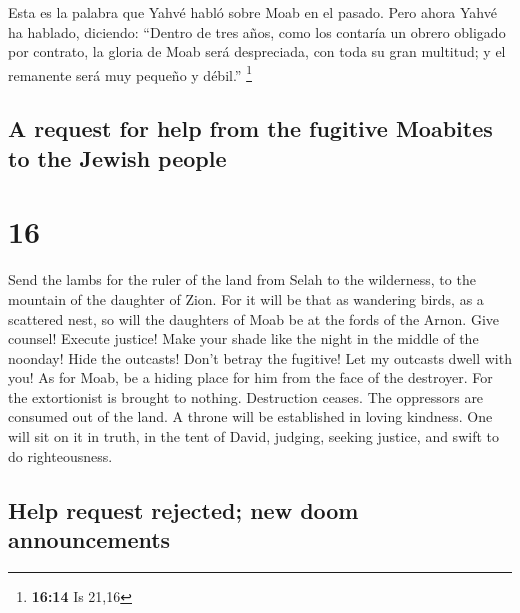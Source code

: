 \begin{paracol}{2}
 Esta es la palabra que Yahvé habló sobre Moab en el
pasado.  Pero ahora Yahvé ha hablado, diciendo: ``Dentro
de tres años, como los contaría un obrero obligado por contrato, la
gloria de Moab será despreciada, con toda su gran multitud; y el
remanente será muy pequeño y débil.'' \footnote{\textbf{16:14} Is 21,16}

\switchcolumn
\begin{otherlanguage}{english}

\hypertarget{a-request-for-help-from-the-fugitive-moabites-to-the-jewish-people}{%
\subsection{A request for help from the fugitive Moabites to the Jewish
people}\label{a-request-for-help-from-the-fugitive-moabites-to-the-jewish-people}}

\hypertarget{section-31}{%
\section{16}\label{section-31}}

 Send the lambs for the ruler of the land from Selah to
the wilderness, to the mountain of the daughter of Zion. 
For it will be that as wandering birds, as a scattered nest, so will the
daughters of Moab be at the fords of the Arnon.  Give
counsel! Execute justice! Make your shade like the night in the middle
of the noonday! Hide the outcasts! Don't betray the fugitive!
 Let my outcasts dwell with you! As for Moab, be a hiding
place for him from the face of the destroyer. For the extortionist is
brought to nothing. Destruction ceases. The oppressors are consumed out
of the land.  A throne will be established in loving
kindness. One will sit on it in truth, in the tent of David, judging,
seeking justice, and swift to do righteousness.

\hypertarget{help-request-rejected-new-doom-announcements}{%
\subsection{Help request rejected; new doom
announcements}\label{help-request-rejected-new-doom-announcements}}


\end{otherlanguage}
\end{paracol}
